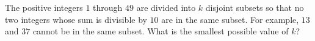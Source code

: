 The positive integers $1$ through $49$ are divided into $k$ disjoint subsets so that no two integers whose sum is divisible by $10$ are in the same subset. For example, $13$ and $37$ cannot be in the same subset. What is the smallest possible value of $k$?
